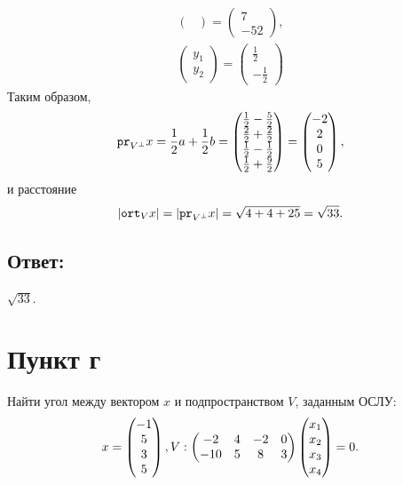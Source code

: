 \documentclass[12pt]{article}
\begin{document}
\begin{gather*}
\begin{pmatrix}
        \end{pmatrix}
        =
        \begin{pmatrix}
            7 \\
            -52
        \end{pmatrix}, \\
        \begin{pmatrix}
            y_1 \\
            y_2
        \end{pmatrix}
        =
        \begin{pmatrix}
            \frac{1}{2} \\
            -\frac{1}{2}
        \end{pmatrix}
    \end{gather*}
    Таким образом,
    \[
        \texttt{pr}_{V^\perp} {x}
        = \frac{1}{2} a + \frac{1}{2} b
        =
        \begin{pmatrix}
            \frac{1}{2} - \frac{5}{2} \\
            \frac{2}{2} + \frac{2}{2} \\
            \frac{1}{2} - \frac{1}{2} \\
            \frac{1}{2} + \frac{9}{2}
        \end{pmatrix}
        =
        \begin{pmatrix}
            -2 \\
            2  \\
            0  \\
            5
        \end{pmatrix},
    \]
    и расстояние
    \[
        \left | \texttt{ort}_{V} {x} \right |
        = \left | \texttt{pr}_{V^\perp} {x} \right |
        = \sqrt{4 + 4 + 25}
        = \sqrt{33} .
    \]

    \subsection*{Ответ:}
    $\sqrt{33}$.

    \section*{Пункт г}
    Найти угол между вектором $x$ и подпространством $V$, заданным ОСЛУ:
    \[
        x =
        \begin{pmatrix}
            -1 \\ 5 \\ 3 \\ 5
        \end{pmatrix}, \\
        V:
        \begin{pmatrix}
            -2  & 4 & -2 & 0 \\
            -10 & 5 & 8  & 3
        \end{pmatrix}
        \begin{pmatrix}
            x_1 \\ x_2 \\ x_3 \\ x_4
        \end{pmatrix}
        = 0 .
    \]
\end{document}

